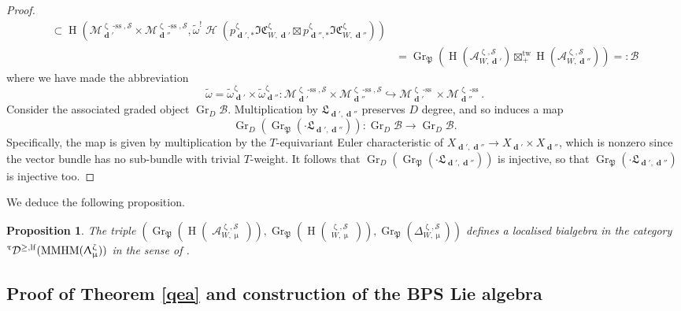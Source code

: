 \documentclass[a4paper,10pt]{amsart}
\renewcommand{\zeta}{\upzeta}
\renewcommand{\Lambda}{\Uplambda}
\renewcommand{\tau}{\uptau}
\renewcommand{\mu}{\upmu}
\newtheorem{proposition}[theorem]{Proposition}
\DeclareMathOperator{\Pf}{\mathfrak{P}}
\newcommand{\SP}{\mathcal{S}}
\newcommand{\Msp}{\mathcal{M}}
\newcommand{\ICSt}{\mathfrak{IC}}
\DeclareMathOperator{\sst}{-ss}
\DeclareMathOperator{\tw}{tw}
\DeclareMathOperator{\MMHM}{MMHM}
\DeclareMathOperator{\Gr}{Gr}
\DeclareMathOperator{\ms}{\tilde{\ast}}
\DeclareMathOperator{\dd}{\mathbf{d}}
\DeclareMathOperator{\Ho}{\mathcal{H}}
\DeclareMathOperator{\HO}{H}
\DeclareMathOperator{\Coha}{\mathcal{A}}
\newcommand{\Dulf}{\mathcal{D}^{\geq, \mathrm{lf}}}
\begin{document}
\begin{proof}
\begin{align*}
\subset \HO\left(\Msp_{\dd'}^{\zeta\sst,\SP}\times \Msp_{\dd''}^{\zeta\sst,\SP}, \tilde{\omega}^!\Ho\left(p^{\zeta}_{\dd',*}\ICSt_{W,\dd'}^{\zeta}\boxtimes p^{\zeta}_{\dd'',*}\ICSt_{W,\dd''}^{\zeta}\right)\right)\\&
=\Gr_{\Pf}\left(\HO(\mathcal{A}_{W,\dd'}^{\zeta,\SP})\boxtimes^{\tw}_+ \HO(\mathcal{A}_{W,\dd''}^{\zeta,\SP})\right)=:\mathcal{B}
\end{align*}
where we have made the abbreviation 
\[
\tilde{\omega}=\tilde{\omega}^{\zeta}_{\dd'}\times\tilde{\omega}^{\zeta}_{\dd''}\colon \Msp^{\zeta\sst,\SP}_{\dd'}\times\Msp^{\zeta\sst,\SP}_{\dd''}\hookrightarrow \Msp^{\zeta\sst}_{\dd'}\times\Msp^{\zeta\sst}_{\dd''}.
\]
Consider the associated graded object $\Gr_D\mathcal{B}$.  Multiplication by $\mathfrak{L}_{\dd',\dd''}$ preserves $D$ degree, and so induces a map 
\[
\Gr_{D}(\Gr_{\Pf}(\cdot \mathfrak{L}_{\dd',\dd''}))\colon \Gr_{D}\mathcal{B}\rightarrow \Gr_{D}\mathcal{B}.
\]
Specifically, the map is given by multiplication by the $T$-equivariant Euler characteristic of $X_{\dd',\dd''}\rightarrow X_{\dd'}\times X_{\dd''}$, which is nonzero since the vector bundle has no sub-bundle with trivial $T$-weight.  It follows that $\Gr_{D}(\Gr_{\Pf}(\cdot \mathfrak{L}_{\dd',\dd''}))$ is injective, so that $\Gr_{\Pf}(\cdot \mathfrak{L}_{\dd',\dd''})$ is injective too.


\end{proof}
We deduce the following proposition.
\begin{proposition}
The triple $\left(\Gr_{\Pf}(\HO(\Coha_{W,\mu}^{\zeta,\SP})),\Gr_{\Pf}(\HO(\ms^{\zeta,\SP}_{W,\mu})),\Gr_{\Pf}(\Delta_{W,\mu}^{\zeta,\SP})\right)$ defines a localised bialgebra in the category ${}^{\tau}\Dulf(\MMHM(\Lambda_{\mu}^{\zeta}))$ in the sense of \cite[Def.5.3]{Da13}.
\end{proposition}


\subsection{Proof of Theorem \ref{qea} and construction of the BPS Lie algebra}
\label{ThmCproof}
\end{document}
